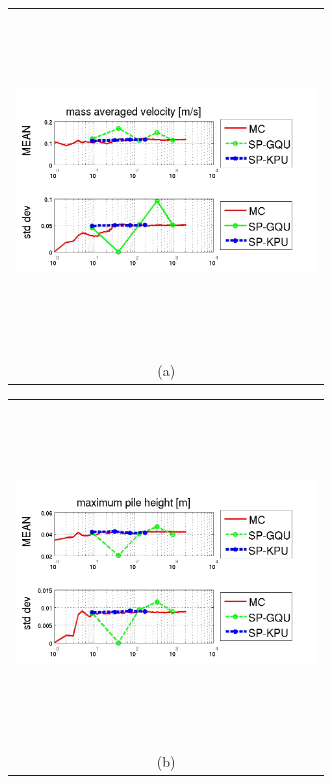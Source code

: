 \documentclass{article}
\newcommand{\Pic}[2][0.85]{\begin{center}\texttt{[image: \#2]}
 \end{center} }
\begin{document}
\begin{figure}[H]
      \begin{minipage}[b]{0.6\textwidth}
        \begin{tabular}{c}
       \includegraphics[width=8cm,height=9cm,keepaspectratio]{fig/pics4rv/unu4rv.jpg}\\
        (a)
        \end{tabular}
    \end{minipage}
      \begin{minipage}[b]{0.6\textwidth}
        \begin{tabular}{c}
       \includegraphics[width=8cm,height=9cm,keepaspectratio]{fig/pics4rv/doi4rv.jpg}\\
        (b)

\end{tabular}
\end{minipage}
\end{figure}
\end{document}
